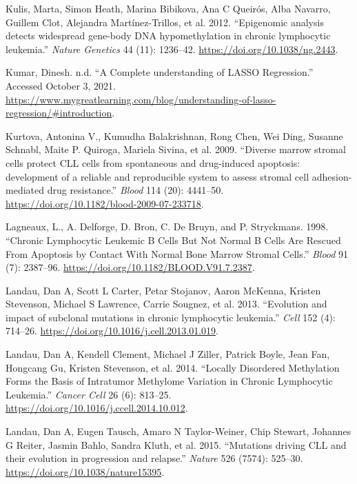 \documentclass[11pt, a4paper, twosided]{book}
\newenvironment{CSLReferences}%
  {}%
  {\par}
\begin{document}
\begin{CSLReferences}{1}{0}
\leavevmode{}%
Kulis, Marta, Simon Heath, Marina Bibikova, Ana C Queirós, Alba Navarro, Guillem Clot, Alejandra Martínez-Trillos, et al. 2012. {``{Epigenomic analysis detects widespread gene-body DNA hypomethylation in chronic lymphocytic leukemia}.''} \emph{Nature Genetics} 44 (11): 1236--42. \url{https://doi.org/10.1038/ng.2443}.

\leavevmode{}%
Kumar, Dinesh. n.d. {``{A Complete understanding of LASSO Regression}.''} Accessed October 3, 2021. \url{https://www.mygreatlearning.com/blog/understanding-of-lasso-regression/\#introduction}.

\leavevmode{}%
Kurtova, Antonina V., Kumudha Balakrishnan, Rong Chen, Wei Ding, Susanne Schnabl, Maite P. Quiroga, Mariela Sivina, et al. 2009. {``{Diverse marrow stromal cells protect CLL cells from spontaneous and drug-induced apoptosis: development of a reliable and reproducible system to assess stromal cell adhesion-mediated drug resistance}.''} \emph{Blood} 114 (20): 4441--50. \url{https://doi.org/10.1182/blood-2009-07-233718}.

\leavevmode{}%
Lagneaux, L., A. Delforge, D. Bron, C. De Bruyn, and P. Stryckmans. 1998. {``{Chronic Lymphocytic Leukemic B Cells But Not Normal B Cells Are Rescued From Apoptosis by Contact With Normal Bone Marrow Stromal Cells}.''} \emph{Blood} 91 (7): 2387--96. \url{https://doi.org/10.1182/BLOOD.V91.7.2387}.

\leavevmode{}%
Landau, Dan A, Scott L Carter, Petar Stojanov, Aaron McKenna, Kristen Stevenson, Michael S Lawrence, Carrie Sougnez, et al. 2013. {``{Evolution and impact of subclonal mutations in chronic lymphocytic leukemia.}''} \emph{Cell} 152 (4): 714--26. \url{https://doi.org/10.1016/j.cell.2013.01.019}.

\leavevmode{}%
Landau, Dan A, Kendell Clement, Michael J Ziller, Patrick Boyle, Jean Fan, Hongcang Gu, Kristen Stevenson, et al. 2014. {``{Locally Disordered Methylation Forms the Basis of Intratumor Methylome Variation in Chronic Lymphocytic Leukemia}.''} \emph{Cancer Cell} 26 (6): 813--25. \url{https://doi.org/10.1016/j.ccell.2014.10.012}.

\leavevmode{}%
Landau, Dan A, Eugen Tausch, Amaro N Taylor-Weiner, Chip Stewart, Johannes G Reiter, Jasmin Bahlo, Sandra Kluth, et al. 2015. {``{Mutations driving CLL and their evolution in progression and relapse}.''} \emph{Nature} 526 (7574): 525--30. \url{https://doi.org/10.1038/nature15395}.


\end{CSLReferences}
\end{document}
